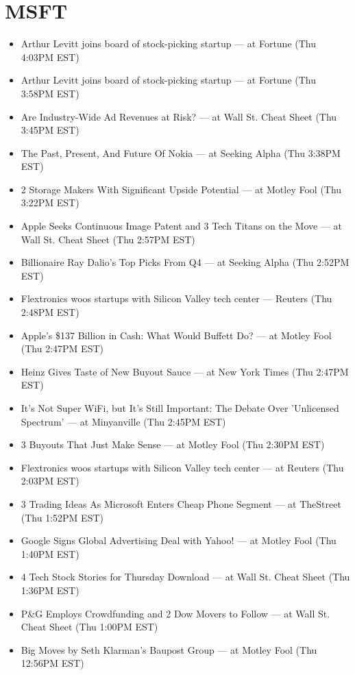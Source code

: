 \documentclass[11pt,asymmetric]{article}
\begin{document}
\section*{MSFT}
\begin{itemize}
\item Arthur Levitt joins board of stock-picking startup --- at Fortune (Thu 4:03PM EST)
\item Arthur Levitt joins board of stock-picking startup --- at Fortune (Thu 3:58PM EST)
\item Are Industry-Wide Ad Revenues at Risk? --- at Wall St. Cheat Sheet (Thu 3:45PM EST)
\item The Past, Present, And Future Of Nokia --- at Seeking Alpha (Thu 3:38PM EST)
\item 2 Storage Makers With Significant Upside Potential --- at Motley Fool (Thu 3:22PM EST)
\item Apple Seeks Continuous Image Patent and 3 Tech Titans on the Move --- at Wall St. Cheat Sheet (Thu 2:57PM EST)
\item Billionaire Ray Dalio's Top Picks From Q4 --- at Seeking Alpha (Thu 2:52PM EST)
\item Flextronics woos startups with Silicon Valley tech center --- Reuters (Thu 2:48PM EST)
\item Apple's \$137 Billion in Cash: What Would Buffett Do? --- at Motley Fool (Thu 2:47PM EST)
\item Heinz Gives Taste of New Buyout Sauce --- at New York Times (Thu 2:47PM EST)
\item It's Not Super WiFi, but It's Still Important: The Debate Over 'Unlicensed Spectrum' --- at Minyanville (Thu 2:45PM EST)
\item 3 Buyouts That Just Make Sense --- at Motley Fool (Thu 2:30PM EST)
\item Flextronics woos startups with Silicon Valley tech center --- at Reuters (Thu 2:03PM EST)
\item 3 Trading Ideas As Microsoft Enters Cheap Phone Segment --- at TheStreet (Thu 1:52PM EST)
\item Google Signs Global Advertising Deal with Yahoo! --- at Motley Fool (Thu 1:40PM EST)
\item 4 Tech Stock Stories for Thursday Download --- at Wall St. Cheat Sheet (Thu 1:36PM EST)
\item P\&G Employs Crowdfunding and 2 Dow Movers to Follow --- at Wall St. Cheat Sheet (Thu 1:00PM EST)
\item Big Moves by Seth Klarman’s Baupost Group --- at Motley Fool (Thu 12:56PM EST)

\end{itemize}
\end{document}
